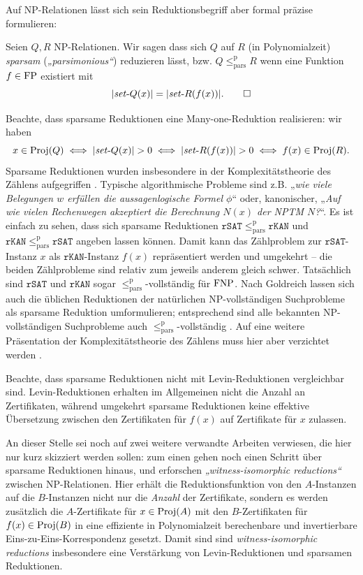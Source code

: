 Auf NP-Relationen lässt sich sein Reduktionsbegriff aber formal präzise formulieren:
\begin{definition}
    Seien $Q, R$ NP-Relationen. Wir sagen dass sich $Q$ auf $R$ (in Polynomialzeit) \emph{sparsam} (\emph{„parsimonious“}) reduzieren lässt, bzw. $Q\leq_\mathrm{pars}^\mathrm p R$ wenn eine Funktion $f\in\mathrm{FP}$ existiert mit
    \[ |\mathit{set}\text{-}{}Q(x)|=|\mathit{set}\text{-}{}R(f(x))|. \qedhere \]
\end{definition}

Beachte, dass sparsame Reduktionen eine Many-one-Reduktion realisieren: wir haben 
\[ x\in\Proj(Q) \iff |\fset{}Q(x)|>0 \iff |\fset{}R(f(x))|>0 \iff f(x)\in\Proj(R). \]
Sparsame Reduktionen wurden insbesondere in der Komplexitätstheorie des Zählens aufgegriffen \parencites{simon_central_1975}{valiant_complexity_1979}. Typische algorithmische Probleme sind z.B. „\emph{wie viele Belegungen $w$ erfüllen die aussagenlogische Formel $\phi$}“ oder, kanonischer, „\emph{Auf wie vielen Rechenwegen akzeptiert die Berechnung $N(x)$ der NPTM $N$?}“. Es ist einfach zu sehen, dass sich sparsame Reduktionen $\mathtt{rSAT}\leq_\mathrm{pars}^\mathrm p \mathtt{rKAN}$ und $\mathtt{rKAN}\leq_\mathrm{pars}^\mathrm p \mathtt{rSAT}$ angeben lassen können. Damit kann das Zählproblem zur $\mathtt{rSAT}$-Instanz $x$ als $\mathtt{rKAN}$-Instanz $f(x)$ repräsentiert werden und umgekehrt – die beiden Zählprobleme sind relativ zum jeweils anderem gleich schwer. Tatsächlich sind $\mathtt{rSAT}$ und $\mathtt{rKAN}$ sogar $\leq_\mathrm{pars}^\mathrm p$-vollständig für $\mathrm{FNP}$. Nach Goldreich lassen sich auch die üblichen Reduktionen der natürlichen NP-vollständigen Suchprobleme als sparsame Reduktion umformulieren; entsprechend sind alle bekannten NP-vollständigen Suchprobleme auch $\leq_\mathrm{pars}^\mathrm p$-vollständig \textcite[204]{goldreich_computational_2008}. Auf eine weitere Präsentation der Komplexitätstheorie des Zählens muss hier aber verzichtet werden \parencites(siehe)()[Kap.~7]{wechsung_vorlesungen_2000}[Chap.~17]{arora_computational_2009}.

Beachte, dass sparsame Reduktionen nicht mit Levin-Reduktionen vergleichbar sind. Levin-Reduktionen erhalten im Allgemeinen nicht die Anzahl an Zertifikaten, während umgekehrt sparsame Reduktionen keine effektive Übersetzung zwischen den Zertifikaten für $f(x)$ auf Zertifikate für $x$ zulassen.

An dieser Stelle sei noch auf zwei weitere verwandte Arbeiten verwiesen, die hier nur kurz skizziert werden sollen: zum einen gehen \textcite{wiedermann_witness-isomorphic_1995} noch einen Schritt über sparsame Reduktionen hinaus, und erforschen \emph{„witness-isomorphic reductions“} zwischen NP-Relationen. Hier erhält die Reduktionsfunktion von den $A$-Instanzen auf die $B$-Instanzen nicht nur die \emph{Anzahl} der Zertifikate, sondern es werden zusätzlich die $A$-Zertifikate für $x\in\operatorname{Proj}(A)$ mit den $B$-Zertifikaten für $f(x)\in \operatorname{Proj}(B)$ in eine effiziente in Polynomialzeit berechenbare und invertierbare Eins-zu-Eins-Korrespondenz gesetzt. Damit sind sind \emph{witness-isomorphic reductions} insbesondere eine Verstärkung von Levin-Reduktionen und sparsamen Reduktionen.

